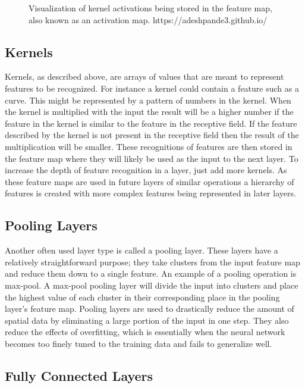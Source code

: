 \documentclass{sig-alternate}
\begin{document}
\begin{figure}
\centering
{}
\caption{Visualization of kernel activations being stored in the feature map, also known as an activation map. https://adeshpande3.github.io/}
\label{fig:ActivationMap}
\end{figure}

\subsection{Kernels}
\label{sec:kernels}

Kernels, as described above, are arrays of values that are meant to represent features to be recognized. For instance a kernel could contain a feature such as a curve. This might be represented by a pattern of numbers in the kernel. When the kernel is multiplied with the input the result will be a higher number if the feature in the kernel is similar to the feature in the receptive field. If the feature described by the kernel is not present in the receptive field then the result of the multiplication will be smaller. These recognitions of features are then stored in the feature map where they will likely be used as the input to the next layer. To increase the depth of feature recognition in a layer, just add more kernels. As these feature maps are used in future layers of similar operations a hierarchy of features is created with more complex features being represented in later layers.

\subsection{Pooling Layers}
\label{sec:poolingLayers}

Another often used layer type is called a pooling layer. These layers have a relatively straightforward purpose; they take clusters from the input feature map and reduce them down to a single feature. An example of a pooling operation is max-pool. A max-pool pooling layer will divide the input into clusters and place the highest value of each cluster in their corresponding place in the pooling layer's feature map. Pooling layers are used to drastically reduce the amount of spatial data by eliminating a large portion of the input in one step. They also reduce the effects of overfitting, which is essentially when the neural network becomes too finely tuned to the training data and fails to generalize well.

\subsection{Fully Connected Layers}
\label{sec:fullyConnected}
\end{document}
